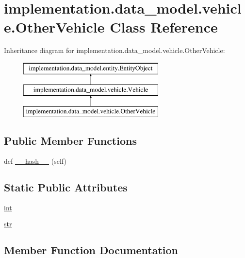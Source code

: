 \hypertarget{classimplementation_1_1data__model_1_1vehicle_1_1_other_vehicle}{}\section{implementation.\+data\+\_\+model.\+vehicle.\+Other\+Vehicle Class Reference}
\label{classimplementation_1_1data__model_1_1vehicle_1_1_other_vehicle}
Inheritance diagram for implementation.\+data\+\_\+model.\+vehicle.\+Other\+Vehicle\+:\begin{figure}[H]
\begin{center}
\leavevmode
\includegraphics[height=3.000000cm]{classimplementation_1_1data__model_1_1vehicle_1_1_other_vehicle}
\end{center}
\end{figure}
\subsection*{Public Member Functions}
\begin{DoxyCompactItemize}
\item 
def \hyperlink{classimplementation_1_1data__model_1_1vehicle_1_1_other_vehicle_a9f8e9fb2fde253bf05b3b39c816b31bc}{\+\_\+\+\_\+hash\+\_\+\+\_\+} (self)
\end{DoxyCompactItemize}
\subsection*{Static Public Attributes}
\begin{DoxyCompactItemize}
\item 
\hyperlink{classimplementation_1_1data__model_1_1vehicle_1_1_other_vehicle_ab0196aae1ffc72e88df02cf3992efaaf}{int}
\item 
\hyperlink{classimplementation_1_1data__model_1_1vehicle_1_1_other_vehicle_aece2c603a961ed55846d522192ff63d2}{str}
\end{DoxyCompactItemize}


\subsection{Member Function Documentation}
\mbox{\label{classimplementation_1_1data__model_1_1vehicle_1_1_other_vehicle_a9f8e9fb2fde253bf05b3b39c816b31bc}} 
